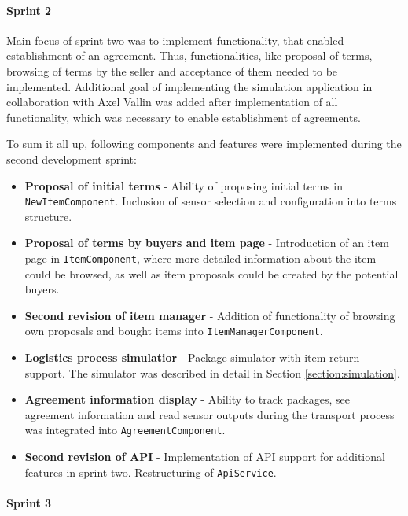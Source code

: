 \paragraph{Sprint 2}
Main focus of sprint two was to implement functionality, that enabled establishment of an agreement. Thus, functionalities, like proposal of terms, browsing of terms by the seller and acceptance of them needed to be implemented. Additional goal of implementing the simulation application in collaboration with Axel Vallin was added after implementation of all functionality, which was necessary to enable establishment of agreements. 

To sum it all up, following components and features were implemented during the second development sprint:

\begin{itemize}
\item \textbf{Proposal of initial terms} - Ability of proposing initial terms in \texttt{NewItemComponent}. Inclusion of sensor selection and configuration into terms structure.

\item \textbf{Proposal of terms by buyers and item page} - Introduction of an item page in \texttt{ItemComponent}, where more detailed information about the item could be browsed, as well as item proposals could be created by the potential buyers.

\item \textbf{Second revision of item manager} - Addition of functionality of browsing own proposals and bought items into \texttt{ItemManagerComponent}.

\item \textbf{Logistics process simulatior} - Package simulator with item return support. The simulator was described in detail in Section \ref{section:simulation}.

\item \textbf{Agreement information display} - Ability to track packages, see agreement information and read sensor outputs during the transport process was integrated into \texttt{AgreementComponent}.

\item \textbf{Second revision of API} - Implementation of API support for additional features in sprint two. Restructuring of \texttt{ApiService}.
\end{itemize}

\paragraph{Sprint 3}

